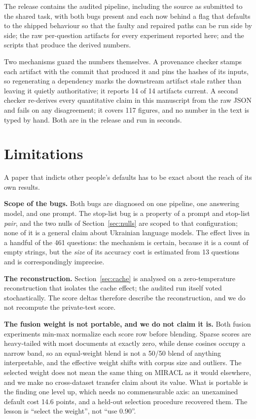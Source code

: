 \documentclass{article}
\begin{document}
The release contains the audited pipeline, including the source as submitted to the shared task, with both bugs present and each now behind a flag that defaults to the shipped behaviour so that the faulty and repaired paths can be run side by side; the raw per-question artifacts for every experiment reported here; and the scripts that produce the derived numbers.

Two mechanisms guard the numbers themselves. A provenance checker stamps each artifact with the commit that produced it and pins the hashes of its inputs, so regenerating a dependency marks the downstream artifact stale rather than leaving it quietly authoritative; it reports 14 of 14 artifacts current. A second checker re-derives every quantitative claim in this manuscript from the raw JSON and fails on any disagreement; it covers 117 figures, and no number in the text is typed by hand. Both are in the release and run in seconds.

\section{Limitations}

A paper that indicts other people's defaults has to be exact about the reach of its own results.

\textbf{Scope of the bugs.} Both bugs are diagnosed on one pipeline, one answering model, and one prompt. The stop-list bug is a property of a prompt and stop-list \emph{pair}, and the two nulls of Section~\ref{sec:nulls} are scoped to that configuration; none of it is a general claim about Ukrainian language models. The effect lives in a handful of the 461 questions: the mechanism is certain, because it is a count of empty strings, but the \emph{size} of its accuracy cost is estimated from 13 questions and is correspondingly imprecise.

\textbf{The reconstruction.} Section~\ref{sec:cache} is analysed on a zero-temperature reconstruction that isolates the cache effect; the audited run itself voted stochastically. The score deltas therefore describe the reconstruction, and we do not recompute the private-test score.

\textbf{The fusion weight is not portable, and we do not claim it is.} Both fusion experiments min-max normalize each score row before blending. Sparse scores are heavy-tailed with most documents at exactly zero, while dense cosines occupy a narrow band, so an equal-weight blend is not a 50/50 blend of anything interpretable, and the effective weight shifts with corpus size and outliers. The selected weight does not mean the same thing on MIRACL as it would elsewhere, and we make no cross-dataset transfer claim about its value. What is portable is the finding one level up, which needs no commensurable axis: an unexamined default cost 14.6 points, and a held-out selection procedure recovered them. The lesson is ``select the weight'', not ``use 0.90''.
\end{document}
